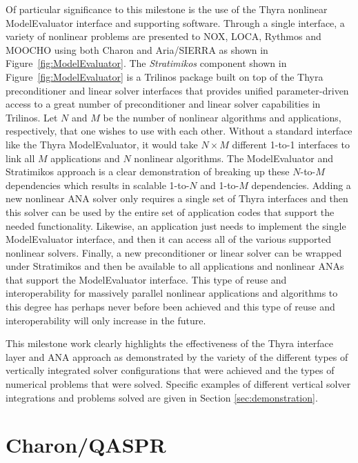\documentclass[pdf,ps2pdf,11pt]{SANDreport}
\begin{document}
Of particular significance to this milestone is the use of the Thyra nonlinear
ModelEvaluator interface and supporting software.  Through a single interface,
a variety of nonlinear problems are presented to NOX, LOCA, Rythmos and MOOCHO
using both Charon and Aria/SIERRA as shown in Figure~\ref{fig:ModelEvaluator}.
The {}\textit{Stratimikos} component shown in Figure~\ref{fig:ModelEvaluator}
is a Trilinos package built on top of the Thyra preconditioner and linear solver
interfaces that provides unified parameter-driven access to a great number of
preconditioner and linear solver capabilities in Trilinos.  Let $N$ and $M$ be
the number of nonlinear algorithms and applications, respectively, that one wishes
to use with each other.  Without a standard interface like the Thyra ModelEvaluator,
it would take $N {}\times M$ different 1-to-1 interfaces to link all $M$ applications
and $N$ nonlinear algorithms.  The ModelEvaluator
and Stratimikos approach is a clear demonstration of breaking up these $N$-to-$M$
dependencies which results in scalable 1-to-$N$ and 1-to-$M$ dependencies.  Adding
a new nonlinear ANA solver only requires a single set of Thyra interfaces and
then this solver can be used by the entire set of application codes that
support the needed functionality.  Likewise, an application just needs to
implement the single ModelEvaluator interface, and then it can access all of
the various supported nonlinear solvers.  Finally, a new preconditioner or
linear solver can be wrapped under Stratimikos and then be available to all
applications and nonlinear ANAs that support the ModelEvaluator interface.
This type of reuse and interoperability for massively parallel nonlinear
applications and algorithms to this degree has perhaps never before been achieved and
this type of reuse and interoperability will only increase in the future.

This milestone work clearly highlights the effectiveness of the Thyra
interface layer and ANA approach as demonstrated by the variety of the
different types of vertically integrated solver configurations that were
achieved and the types of numerical problems that were solved.  Specific
examples of different vertical solver integrations and problems solved are
given in Section {}\ref{sec:demonstration}.


%
\section{Charon/QASPR}
%
\end{document}

